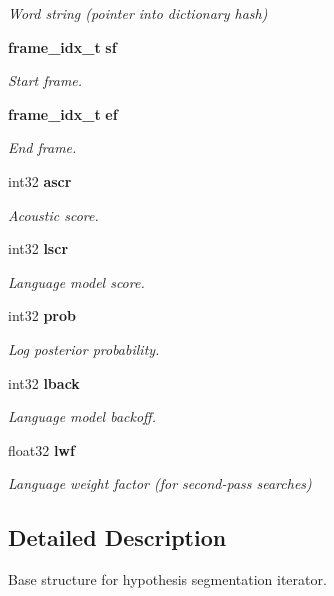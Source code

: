 \begin{DoxyCompactItemize}
\begin{DoxyCompactList}\small\item\em Word string (pointer into dictionary hash) \end{DoxyCompactList}\item 
{\bf frame\+\_\+idx\+\_\+t} {\bf sf}
\begin{DoxyCompactList}\small\item\em Start frame. \end{DoxyCompactList}\item 
{\bf frame\+\_\+idx\+\_\+t} {\bf ef}
\begin{DoxyCompactList}\small\item\em End frame. \end{DoxyCompactList}\item 
int32 {\bf ascr}
\begin{DoxyCompactList}\small\item\em Acoustic score. \end{DoxyCompactList}\item 
int32 {\bf lscr}
\begin{DoxyCompactList}\small\item\em Language model score. \end{DoxyCompactList}\item 
int32 {\bf prob}
\begin{DoxyCompactList}\small\item\em Log posterior probability. \end{DoxyCompactList}\item 
int32 {\bf lback}
\begin{DoxyCompactList}\small\item\em Language model backoff. \end{DoxyCompactList}\item 
float32 {\bf lwf}\label{structps__seg__s_a2249c012b83c902f4f8ed8d98ded7d20}

\begin{DoxyCompactList}\small\item\em Language weight factor (for second-\/pass searches) \end{DoxyCompactList}\end{DoxyCompactItemize}


\subsection{Detailed Description}
Base structure for hypothesis segmentation iterator. 

